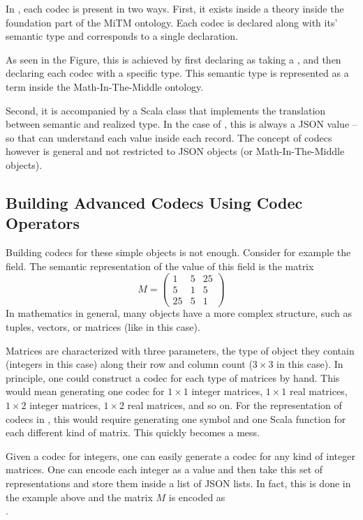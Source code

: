 In \mmt, each codec is present in two ways.
First, it exists inside a  theory inside the foundation part of the MiTM ontology. 
Each codec is declared along with its' semantic type and corresponds to a single declaration. 

As seen in the Figure, this is achieved by first declaring  as taking a , and then declaring each codec with a specific type. 
This semantic type is represented as a term inside the Math-In-The-Middle ontology. 

Second, it is accompanied by a Scala class that implements the translation between semantic and realized type. 
In the case of \lmfdb, this is always a JSON value -- so that \mmt can understand each value inside each \lmfdb record. 
The concept of codecs however is general and not restricted to JSON objects (or Math-In-The-Middle objects). 

\subsection{Building Advanced Codecs Using Codec Operators}\label{sec:vt:operators}

Building codecs for these simple objects is not enough. 
Consider for example the  field. 
The semantic representation of the value of this field is the matrix
\[M = \left(
    \begin{array}{ccc}
      1 & 5 & 25 \\
      5 & 1 & 5 \\
      25 & 5 & 1 \end{array} 
  \right)
\]
In mathematics in general, many objects have a more complex structure, such as tuples, vectors, or matrices (like in this case). 

Matrices are characterized with three parameters, the type of object they contain (integers in this case) along their row and column count ($3 \times 3$ in this case). 
In principle, one could construct a codec for each type of matrices by hand. 
This would mean generating one codec for $1 \times 1$ integer matrices, $1 \times 1$ real matrices, $1 \times 2$ integer matrices, $1 \times  2$ real matrices, and so on. 
For the representation of codecs in \mmt, this would require generating one symbol and one Scala function for each different kind of matrix. 
This quickly becomes a mess. 

Given a codec for integers, one can easily generate a codec for any kind of integer matrices. 
One can encode each integer as a value and then take this set of representations and store them inside a list of JSON lists.
In fact, this is done in the example above and the matrix $M$ is encoded as
\\\noindent\inlinecode{[[1.0,5.0,25.0],[5.0,1.0,5.0],[25.0,5.0,1.0]]}. 

